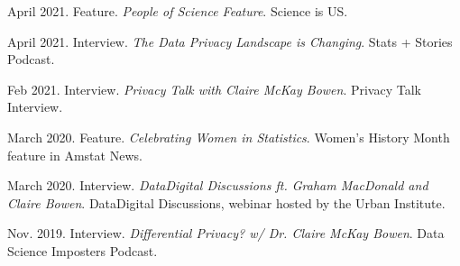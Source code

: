 \begin{etaremune}[topsep=0pt, itemsep=4pt, partopsep=0pt, parsep=0pt]
    \item April 2021. Feature. \textit{People of Science Feature}. Science is US.
    
    \item April 2021. Interview. \textit{The Data Privacy Landscape is Changing}. Stats + Stories Podcast.
    
    \item Feb 2021. Interview. \textit{Privacy Talk with Claire McKay Bowen}. Privacy Talk Interview.

    \item March 2020. Feature. \textit{Celebrating Women in Statistics}. Women's History Month feature in Amstat News.

    \item March 2020. Interview. \textit{Data\@Urban Digital Discussions ft. Graham MacDonald and Claire Bowen}. Data\@Urban Digital Discussions, webinar hosted by the Urban Institute.
    
    \item Nov. 2019. Interview. \textit{Differential Privacy? w/ Dr. Claire McKay Bowen}. Data Science Imposters Podcast.
\end{etaremune}
